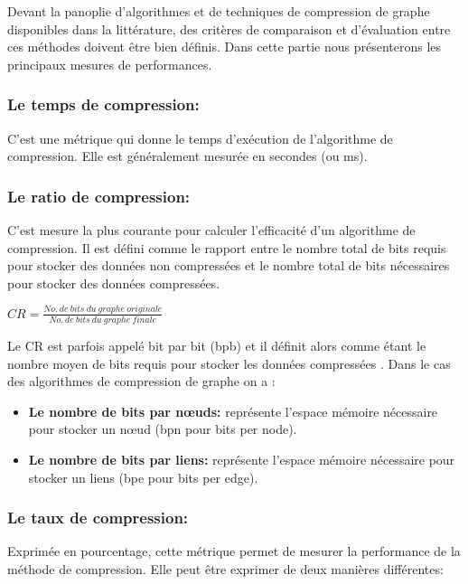 	
				Devant la panoplie d'algorithmes et de techniques de compression de graphe disponibles dans la littérature, des critères de comparaison  et d'évaluation entre ces méthodes doivent être bien définis. Dans cette partie nous présenterons les principaux mesures de performances.
				
				\subsubsection{Le temps de compression:}
				C'est une métrique qui donne le temps d'exécution de l'algorithme de compression. Elle est généralement mesurée en secondes (ou ms).
				\subsubsection{Le ratio de compression:}
				C'est mesure la plus courante pour calculer l'efficacité d'un algorithme de compression. Il est défini comme le rapport entre le nombre total de bits requis pour stocker des données non compressées et le nombre total de bits nécessaires pour stocker des données compressées.
				\begin{center}
				$
				CR = \frac{No.\ de\ bits\ du\ graphe\ originale}{No.\ de\ bits\ du\ graphe\ finale }
				$
				\end{center}
				
				
				Le CR est parfois appelé bit par bit (bpb) et il définit alors comme étant le nombre moyen de bits requis pour stocker les données compressées \citep{uthayakumar2018survey}. Dans le cas des algorithmes de compression de graphe on a :
				\begin{itemize}
					\item \textbf{Le nombre de bits par nœuds:}
					représente l'espace mémoire nécessaire pour stocker un nœud (bpn pour bits per node).
					
					\item \textbf{Le nombre de bits par liens:}
					représente l'espace mémoire nécessaire pour stocker un liens (bpe pour bits per edge).
				\end{itemize}
				
				
				
				
				
				
				\subsubsection{Le taux de compression:}
				Exprimée en pourcentage, cette métrique permet de mesurer la performance de la méthode de compression. Elle peut être exprimer de deux manières différentes:
				
